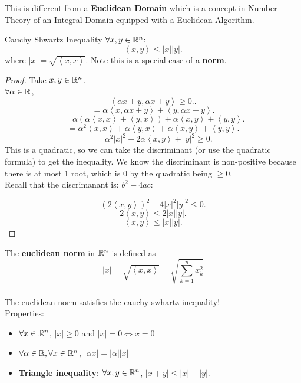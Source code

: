 \documentclass[a4paper]{article}
\begin{document}
\begin{remark}
  This is different from a \textbf{Euclidean Domain} which is a concept in Number Theory of an Integral Domain equipped with a Euclidean Algorithm.
\end{remark}

\begin{definition}{Cauchy Shwartz Inequality}
  $\forall x,y \in \mathbb{R}^n$:
  \[
  \left< x,y  \right> \leq |x| |y|
  .\] 
  where $|x| = \sqrt{\left< x,x \right>}$. Note this is a special case of a \textbf{norm}.
\end{definition}

\begin{proof}
  Take $x,y \in \mathbb{R}^n$. \\

  $\forall \alpha \in \mathbb{R}$,
  \[
  \left< \alpha x + y, \alpha x + y \right> \geq 0.
  .\] 
  \[
  = \alpha \left< x , \alpha x + y \right> + \left< y, \alpha x + y \right>
  .\]
  \[
  = \alpha (\alpha \left< x, x \right> + \left< y, x \right>) + \alpha \left<x , y \right> + \left< y, y \right> 
  .\]
  \[
   = \alpha^2 \left< x, x \right> + \alpha \left< y, x \right> + \alpha \left<x , y \right> + \left< y, y \right> 
  .\] 
  \[
  = \alpha^2 |x|^2 + 2 \alpha \left< x, y \right> + |y|^2 \geq 0
  .\]
  This is a quadratic, so we can take the discriminant (or use the quadratic formula) to get the inequality. We know the
  discriminant is non-positive because there is at most 1 root, which is 0 by the quadratic being $\geq 0$. \\
  Recall that the discrimanant is: $b^2 - 4ac$:

  \[
    (2 \left< x,y \right>)^2- 4 |x|^2 |y|^2 \leq 0
  .\] 
  \[
  2 \left< x,y \right> \leq 2 |x| |y|
  .\] 
  \[
  \left< x,y \right> \leq |x| |y|
  .\] 
\end{proof}

\begin{definition}
  The \textbf{euclidean norm} in $\mathbb{R}^n$ is defined as $$|x| = \sqrt{\left<x,x \right>} = \sqrt{\sum_{k=1}^n x_k^2}$$ \\
  The euclidean norm satisfies the cauchy swhartz inequality! \\
  Properties: 
  \begin{itemize}
    \item $\forall x \in \mathbb{R}^n$, $|x| \geq 0$ and  $|x| = 0 \iff x = 0$
    \item $\forall \alpha \in \mathbb{R}, \forall x \in \mathbb{R}^n$, $|\alpha x|= |\alpha| |x|$
    \item \textbf{Triangle inequality}:  $\forall x,y \in \mathbb{R}^n$, $|x + y| \leq |x| + |y|$. 
  \end{itemize}
\end{definition}
\end{document}
